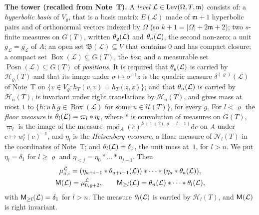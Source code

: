 \documentclass[11pt,a4paper]{article}
\newcommand{\subhead}[1]{\par\addvspace{9pt plus 2pt}\Needspace{4\baselineskip}\noindent\textbf{#1}\enspace\ignorespaces}
\theoremstyle{plainx}
\theoremstyle{uprightx}
\newcommand{\cL}{\mathcal{L}}
\newcommand{\dd}{\mathrm{d}}
\newcommand{\GT}[1]{G(#1)}
\newcommand{\Hl}[2]{\mathcal{H}_{#1}(#2)}
\newcommand{\Nf}[2]{\mathcal{N}_{#1}(#2)}
\newcommand{\UT}[1]{\mathcal{U}(#1)}
\newcommand{\modA}{\operatorname{mod}_A}
\newcommand{\wo}[2]{w^{\circ}_{#1}(#2)}
\newcommand{\gL}[1]{g_{#1}}
\newcommand{\BoxL}[1]{\operatorname{Box}(#1)}
\newcommand{\Posn}[1]{\operatorname{Posn}(#1)}
\newcommand{\Ball}[1]{\mathfrak{B}(#1)}
\newcommand{\etab}[1]{\eta_{<#1}}
\newcommand{\quadric}[2]{\delta^{(#2)}(#1)}
\begin{document}
\subhead{The tower (recalled from Note~T).}\label{s:tower} A \emph{level}
$\cL\in\Levels{\Omega}{T}{\mathfrak{m}}$ consists of: a \emph{hyperbolic basis} of $V_\varrho$, that is a basis matrix
$E(\cL)$ made of $\mathfrak{m}+1$ hyperbolic pairs and of orthonormal vectors indexed by $\Omega$ (so
$k+1=|\Omega|+2\mathfrak{m}+2$); two $s$-finite measures on $\GT{T}$, written $\floorMeasure{\cL}{\varrho}$ and
$\floorMeasure{\cL}{n}$, the second non-zero; a unit $\gL{\cL}=\overline{\gL{\cL}}$ of $A$; an open set
$\Ball{\cL}\subseteq V$ that contains $0$ and has compact closure; a compact set $\BoxL{\cL}\subseteq\GT{T}$, the
\emph{box}; and a measurable set $\Posn{\cL}\subseteq\GT{T}$ of \emph{positions}. It is required that
$\floorMeasure{\cL}{\varrho}$ is carried by $\Hl{\varrho}{T}$ and that its image under $\sigma\mapsto\sigma^{-1}z$ is
the quadric measure $\quadric{\cL}{\varrho}$ of Note~T on $\{v\in V_\varrho:h_T(v,v)=h_T(z,z)\}$; and that
$\floorMeasure{\cL}{n}$ is carried by $\Hl{n}{T}$, is invariant under right translations by $\Hl{n}{T}$, and gives
mass at most $1$ to $\{h:u\,h\,g\in\BoxL{\cL}\text{ for some }u\in\UT{T}\}$, for every $g$. For $l<\varrho$ the
\emph{floor measure} is $\floorMeasure{\cL}{l}=\varpi_l*\eta_l$, where $*$ is convolution of measures on $\GT{T}$,
$\varpi_l$ is the image of the measure $\modA(c)^{k+1+2(\varrho-l-1)}\dd c$ on $A$ under $c\mapsto\wo{l}{c}^{-1}$,
and $\eta_l$ is the \emph{Heisenberg measure}, a Haar measure of $\Nf{l}{T}$ in the coordinates of Note~T; and
$\floorMeasure{\cL}{l}=\delta_1$, the unit mass at~$1$, for $l>n$. We put $\eta_l=\delta_1$ for $l\ge\varrho$ and
$\etab{j}=\eta_0*\dots*\eta_{j-1}$. Then
\[\begin{gathered}
\stackMeasure{\cL}_{a,i}=(\eta_{a+i-1}*\floorMeasure{\cL}{a+i-1})*\dots*(\eta_a*\floorMeasure{\cL}{a}),\\
\groupMeasure{\cL}=\stackMeasure{\cL}_{0,\varrho+2},\qquad
\upperMeasure{\cL}{l}=\floorMeasure{\cL}{n}*\dots*\floorMeasure{\cL}{l},
\end{gathered}\]
with $\upperMeasure{\cL}{l}=\delta_1$ for $l>n$. The measure $\floorMeasure{\cL}{l}$ is carried by $\Hl{l}{T}$, and
$\groupMeasure{\cL}$ is right invariant.
\end{document}
